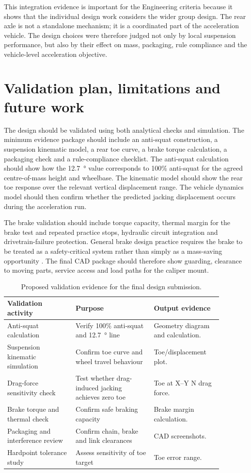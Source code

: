 This integration evidence is important for the Engineering criteria because it shows that the individual design work considers the wider group design. The rear axle is not a standalone mechanism; it is a coordinated part of the acceleration vehicle. The design choices were therefore judged not only by local suspension performance, but also by their effect on mass, packaging, rule compliance and the vehicle-level acceleration objective.

\section{Validation plan, limitations and future work}

The design should be validated using both analytical checks and simulation. The minimum evidence package should include an anti-squat construction, a suspension kinematic model, a rear toe curve, a brake torque calculation, a packaging check and a rule-compliance checklist. The anti-squat calculation should show how the \SI{12.7}{\degree} value corresponds to 100\% anti-squat for the agreed centre-of-mass height and wheelbase. The kinematic model should show the rear toe response over the relevant vertical displacement range. The vehicle dynamics model should then confirm whether the predicted jacking displacement occurs during the acceleration run.

The brake validation should include torque capacity, thermal margin for the brake test and repeated practice stops, hydraulic circuit integration and drivetrain-failure protection. General brake design practice requires the brake to be treated as a safety-critical system rather than simply as a mass-saving opportunity \parencite{limpert2011}. The final CAD package should therefore show guarding, clearance to moving parts, service access and load paths for the caliper mount.

\begin{table}[H]
\caption{Proposed validation evidence for the final design submission.}
\label{tab:validation}
\centering
\begin{tabular}{p{0.28\linewidth}p{0.32\linewidth}p{0.28\linewidth}}
\toprule
Validation activity & Purpose & Output evidence \\
\midrule
Anti-squat calculation & Verify 100\% anti-squat and \SI{12.7}{\degree} line & Geometry diagram and calculation. \\
Suspension kinematic simulation & Confirm toe curve and wheel travel behaviour & Toe/displacement plot. \\
Drag-force sensitivity check & Test whether drag-induced jacking achieves zero toe & Toe at X--Y N drag force. \\
Brake torque and thermal check & Confirm safe braking capacity & Brake margin calculation. \\
Packaging and interference review & Confirm chain, brake and link clearances & CAD screenshots. \\
Hardpoint tolerance study & Assess sensitivity of toe target & Toe error range. \\
\bottomrule
\end{tabular}
\end{table}

